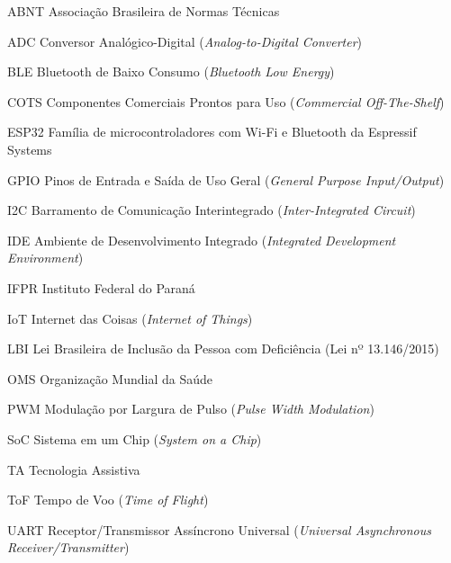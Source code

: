 \listoffigures*
\cleardoublepage

\listofquadros*
\cleardoublepage

\listoftables*
\cleardoublepage

\begin{siglas}
  \item[ABNT] Associação Brasileira de Normas Técnicas
  \item[ADC] Conversor Analógico-Digital (\textit{Analog-to-Digital Converter})
  \item[BLE] Bluetooth de Baixo Consumo (\textit{Bluetooth Low Energy})
  \item[COTS] Componentes Comerciais Prontos para Uso (\textit{Commercial Off-The-Shelf})
  \item[ESP32] Família de microcontroladores com Wi-Fi e Bluetooth da Espressif Systems
  \item[GPIO] Pinos de Entrada e Saída de Uso Geral (\textit{General Purpose Input/Output})
  \item[I2C] Barramento de Comunicação Interintegrado (\textit{Inter-Integrated Circuit})
  \item[IDE] Ambiente de Desenvolvimento Integrado (\textit{Integrated Development Environment})
  \item[IFPR] Instituto Federal do Paraná
  \item[IoT] Internet das Coisas (\textit{Internet of Things})
  \item[LBI] Lei Brasileira de Inclusão da Pessoa com Deficiência (Lei nº 13.146/2015)
  \item[OMS] Organização Mundial da Saúde
  \item[PWM] Modulação por Largura de Pulso (\textit{Pulse Width Modulation})
  \item[SoC] Sistema em um Chip (\textit{System on a Chip})
  \item[TA] Tecnologia Assistiva
  \item[ToF] Tempo de Voo (\textit{Time of Flight})
  \item[UART] Receptor/Transmissor Assíncrono Universal (\textit{Universal Asynchronous Receiver/Transmitter})
\end{siglas}

